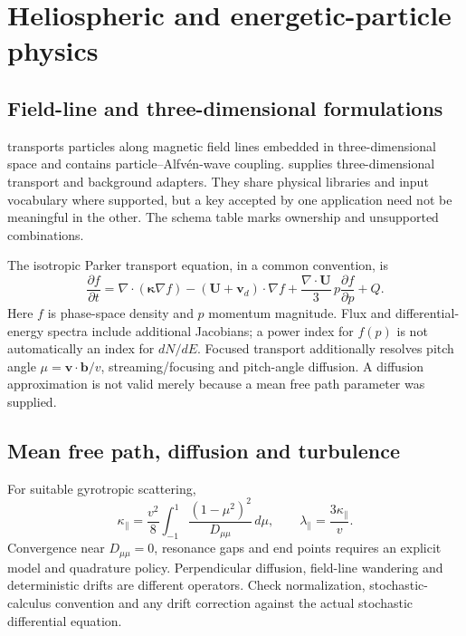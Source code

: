 \chapter{Heliospheric and energetic-particle physics}\label{ch:helio}
\section{Field-line and three-dimensional formulations}
 transports particles along magnetic field lines embedded in
three-dimensional space and contains particle--Alfv\'en-wave coupling.
 supplies three-dimensional transport and background adapters.
They share physical libraries and input vocabulary where supported, but a
key accepted by one application need not be meaningful in the other.
The schema table marks ownership and unsupported combinations.

The isotropic Parker transport equation, in a common convention, is
\begin{equation}
\frac{\partial f}{\partial t}
=\nabla\cdot(\boldsymbol\kappa\nabla f)
-(\boldsymbol U+\boldsymbol v_d)\cdot\nabla f
+\frac{\nabla\cdot\boldsymbol U}{3}\,p\frac{\partial f}{\partial p}+Q.
\end{equation}
Here $f$ is phase-space density and $p$ momentum magnitude. Flux and
differential-energy spectra include additional Jacobians; a power index for
$f(p)$ is not automatically an index for $dN/dE$.
Focused transport additionally resolves pitch angle
$\mu=\boldsymbol v\cdot\boldsymbol b/v$, streaming/focusing and
pitch-angle diffusion. A diffusion approximation is not valid merely
because a mean free path parameter was supplied.

\section{Mean free path, diffusion and turbulence}
For suitable gyrotropic scattering,
\begin{equation}
\kappa_\parallel=\frac{v^2}{8}\int_{-1}^{1}
\frac{(1-\mu^2)^2}{D_{\mu\mu}}\,d\mu,\qquad
\lambda_\parallel=\frac{3\kappa_\parallel}{v}.
\end{equation}
Convergence near $D_{\mu\mu}=0$, resonance gaps and end points requires
an explicit model and quadrature policy. Perpendicular diffusion, field-line
wandering and deterministic drifts are different operators. Check
normalization, stochastic-calculus convention and any drift correction
against the actual stochastic differential equation.

